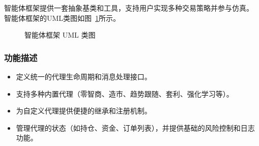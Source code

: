 智能体框架提供一套抽象基类和工具，支持用户实现多种交易策略并参与仿真。
智能体框架的UML类图如图~\ref{fig:uml_agent}所示。

\begin{figure}[htbp]
  \centering
  \resizebox{\linewidth}{!}{}
  \caption{智能体框架 UML 类图}
  \label{fig:uml_agent}
\end{figure}

\subsubsection{功能描述}
\begin{itemize}
  \item 定义统一的代理生命周期和消息处理接口。
  \item 支持多种内置代理（零智商、造市、趋势跟随、套利、强化学习等）。
  \item 为自定义代理提供便捷的继承和注册机制。
  \item 管理代理的状态（如持仓、资金、订单列表），并提供基础的风险控制和日志功能。
\end{itemize}

